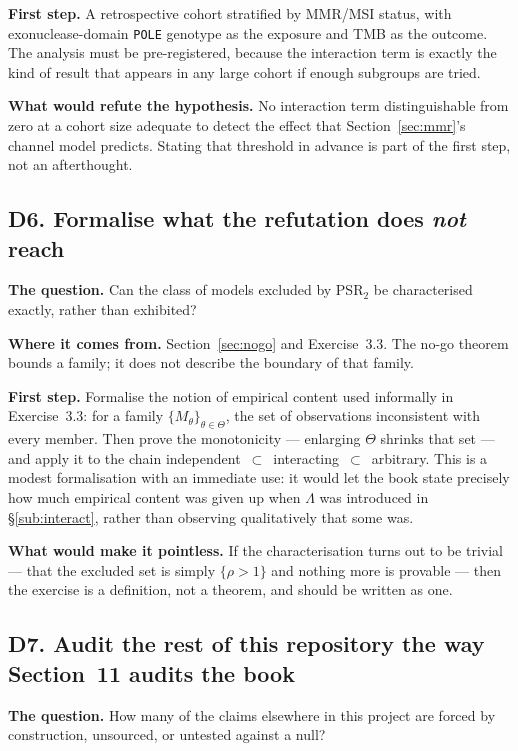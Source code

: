 \textbf{First step.} A retrospective cohort stratified by MMR/MSI status, with
exonuclease-domain \texttt{POLE} genotype as the exposure and TMB as the
outcome. The analysis must be pre-registered, because the interaction term is
exactly the kind of result that appears in any large cohort if enough subgroups
are tried.

\textbf{What would refute the hypothesis.} No interaction term distinguishable
from zero at a cohort size adequate to detect the effect that
Section~\ref{sec:mmr}'s channel model predicts. Stating that threshold in
advance is part of the first step, not an afterthought.

\subsection*{D6. Formalise what the refutation does \emph{not} reach}

\textbf{The question.} Can the class of models excluded by PSR$_2$ be
characterised exactly, rather than exhibited?

\textbf{Where it comes from.} Section~\ref{sec:nogo} and Exercise~3.3. The
no-go theorem bounds a family; it does not describe the boundary of that family.

\textbf{First step.} Formalise the notion of empirical content used informally
in Exercise~3.3: for a family $\{M_\theta\}_{\theta \in \Theta}$, the set of
observations inconsistent with every member. Then prove the monotonicity ---
enlarging $\Theta$ shrinks that set --- and apply it to the chain
independent~$\subset$~interacting~$\subset$~arbitrary. This is a modest
formalisation with an immediate use: it would let the book state precisely how
much empirical content was given up when $\Lambda$ was introduced in
\S\ref{sub:interact}, rather than observing qualitatively that some was.

\textbf{What would make it pointless.} If the characterisation turns out to be
trivial --- that the excluded set is simply $\{\rho > 1\}$ and nothing more is
provable --- then the exercise is a definition, not a theorem, and should be
written as one.

\subsection*{D7. Audit the rest of this repository the way Section~11 audits the book}

\textbf{The question.} How many of the claims elsewhere in this project are
forced by construction, unsourced, or untested against a null?

